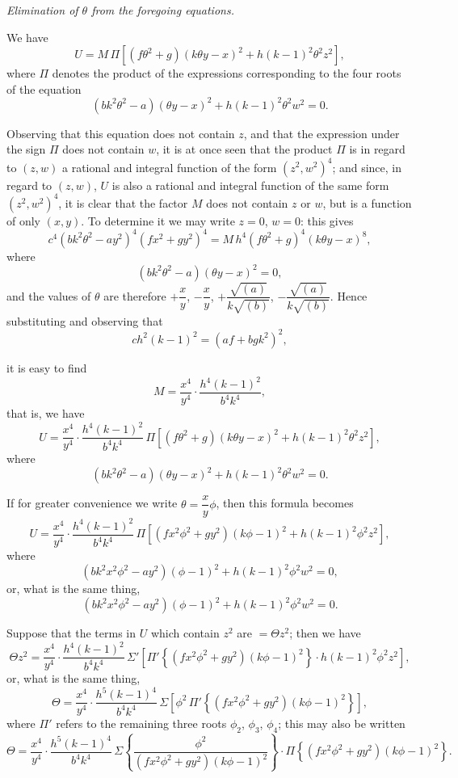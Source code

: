 \documentclass[11pt,a4paper]{article}
\begin{document}
\medskip

\noindent\emph{Elimination of $\theta$ from the foregoing equations.}

We have
\[
U = M\,\Pi\left[(f\theta^{2} + g)(k\theta y - x)^{2} + h(k - 1)^{2}\theta^{2} z^{2}\right],
\]
where $\Pi$ denotes the product of the expressions corresponding to the four roots of the equation
\[
(bk^{2}\theta^{2} - a)(\theta y - x)^{2} + h(k - 1)^{2}\theta^{2} w^{2} = 0.
\]

Observing that this equation does not contain $z$, and that the expression under the sign $\Pi$ does not contain $w$, it is at once seen that the product $\Pi$ is in regard to $(z, w)$ a rational and integral function of the form $(z^{2}, w^{2})^{4}$; and since, in regard to $(z, w)$, $U$ is also a rational and integral function of the same form $(z^{2}, w^{2})^{4}$, it is clear that the factor $M$ does not contain $z$ or $w$, but is a function of only $(x, y)$. To determine it we may write $z = 0$, $w = 0$: this gives
\[
c^{4}(bk^{2}\theta^{2} - a y^{2})^{4}(fx^{2} + gy^{2})^{4} = M\,h^{4}(f\theta^{2} + g)^{4}(k\theta y - x)^{8},
\]
where
\[
(bk^{2}\theta^{2} - a)(\theta y - x)^{2} = 0,
\]
and the values of $\theta$ are therefore $+\dfrac{x}{y}$, $-\dfrac{x}{y}$, $+\dfrac{\sqrt{(a)}}{k\sqrt{(b)}}$, $-\dfrac{\sqrt{(a)}}{k\sqrt{(b)}}$. Hence substituting and observing that
\[
ch^{2}(k - 1)^{2} = (af + bgk^{2})^{2},
\]

\newpage


it is easy to find
\[
M = \frac{x^{4}}{y^{4}} \cdot \frac{h^{4}(k - 1)^{2}}{b^{4}k^{4}},
\]
that is, we have
\[
U = \frac{x^{4}}{y^{4}} \cdot \frac{h^{4}(k - 1)^{2}}{b^{4}k^{4}}\, \Pi\left[(f\theta^{2} + g)(k\theta y - x)^{2} + h(k - 1)^{2}\theta^{2} z^{2}\right],
\]
where
\[
(bk^{2}\theta^{2} - a)(\theta y - x)^{2} + h(k - 1)^{2}\theta^{2} w^{2} = 0.
\]

If for greater convenience we write $\theta = \dfrac{x}{y}\phi$, then this formula becomes
\[
U = \frac{x^{4}}{y^{4}} \cdot \frac{h^{4}(k - 1)^{2}}{b^{4}k^{4}}\, \Pi\left[(fx^{2}\phi^{2} + gy^{2})(k\phi - 1)^{2} + h(k - 1)^{2}\phi^{2} z^{2}\right],
\]
where
\[
(bk^{2}x^{2}\phi^{2} - ay^{2})(\phi - 1)^{2} + h(k - 1)^{2}\phi^{2} w^{2} = 0,
\]
or, what is the same thing,
\[
(bk^{2}x^{2}\phi^{2} - ay^{2})(\phi - 1)^{2} + h(k - 1)^{2}\phi^{2} w^{2} = 0.
\]

Suppose that the terms in $U$ which contain $z^{2}$ are $= \Theta z^{2}$; then we have
\[
\Theta z^{2} = \frac{x^{4}}{y^{4}} \cdot \frac{h^{4}(k - 1)^{2}}{b^{4}k^{4}}\, \Sigma'\!\left[ \Pi'\left\{(fx^{2}\phi^{2} + gy^{2})(k\phi - 1)^{2}\right\} \cdot h(k - 1)^{2}\phi^{2} z^{2} \right],
\]
or, what is the same thing,
\[
\Theta = \frac{x^{4}}{y^{4}} \cdot \frac{h^{5}(k - 1)^{4}}{b^{4}k^{4}}\, \Sigma\!\left[\phi^{2}\, \Pi'\!\left\{(fx^{2}\phi^{2} + gy^{2})(k\phi - 1)^{2}\right\}\right],
\]
where $\Pi'$ refers to the remaining three roots $\phi_{2}$, $\phi_{3}$, $\phi_{4}$; this may also be written
\[
\Theta = \frac{x^{4}}{y^{4}} \cdot \frac{h^{5}(k - 1)^{4}}{b^{4}k^{4}}\, \Sigma\!\left\{ \frac{\phi^{2}}{(fx^{2}\phi^{2} + gy^{2})(k\phi - 1)^{2}} \right\} \cdot \Pi\!\left\{(fx^{2}\phi^{2} + gy^{2})(k\phi - 1)^{2}\right\}.
\]
\end{document}
